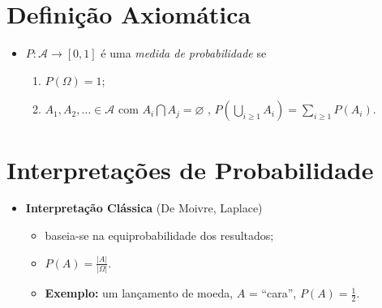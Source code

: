 \documentclass[
]{book}
\providecommand{\tightlist}{%
  \setlength{\itemsep}{0pt}\setlength{\parskip}{0pt}}
\begin{document}
\hypertarget{definiuxe7uxe3o-axiomuxe1tica}{%
\section{Definição Axiomática}\label{definiuxe7uxe3o-axiomuxe1tica}}

\begin{itemize}
\tightlist
\item
  \(P: \mathcal{A} \longrightarrow [0,1]\) é uma \emph{medida de probabilidade} se

  \begin{enumerate}
  \def\labelenumi{\arabic{enumi}.}
  \tightlist
  \item
    \(P(\Omega) = 1\);
  \item
    \(\displaystyle A_1, A_2, \ldots \in \mathcal{A}\) com \(A_i \bigcap A_j = \varnothing\) , \(\displaystyle P\left(\bigcup_{i \geq 1} A_i\right) = \sum_{i \geq 1} P\left(A_i\right)\).
  \end{enumerate}
\end{itemize}

\hypertarget{interpretauxe7uxf5es-de-probabilidade}{%
\section{Interpretações de Probabilidade}\label{interpretauxe7uxf5es-de-probabilidade}}

\begin{itemize}
\tightlist
\item
  \textbf{Interpretação Clássica} (De Moivre, Laplace)

  \begin{itemize}
  \tightlist
  \item
    baseia-se na equiprobabilidade dos resultados;
  \item
    \(P(A) = \frac{|A|}{|\Omega|}\).
  \item
    \textbf{Exemplo:} um lançamento de moeda, \(A\) = ``cara'', \(P(A) = \frac{1}{2}\).
  \end{itemize}
\end{itemize}

\(~\)
\end{document}
